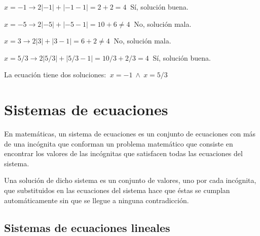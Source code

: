 \begin{miejercicio}
\vspace{2mm} $x=-1 \to 2|-1|+|-1-1|=2+2=4 \ $ Sí, solución buena.

\vspace{2mm} $x=-5 \to 2|-5|+|-5-1|=10+6\neq 4 \ $ No, solución mala.

\vspace{2mm} $x=3\to 2|3|+|3-1|=6+2\neq 4 \ $ No, solución mala.

\vspace{2mm} $x=5/3 \to 2|5/3|+|5/3-1|=10/3+2/3=4\ $ Sí, solución buena.

\vspace{2mm} La ecuación tiene dos soluciones: $\ x=-1 \ \wedge \ x=5/3$


\end{miejercicio}


\vspace{1cm}
\section{Sistemas de ecuaciones}
\vspace{0.5cm}

En matemáticas, un sistema de ecuaciones es un conjunto de ecuaciones con más de una incógnita que conforman un problema matemático que consiste en encontrar los valores de las incógnitas que satisfacen todas las ecuaciones del sistema.

Una solución de dicho sistema es un conjunto de valores, uno por cada incógnita, que substituidos en las ecuaciones del sistema hace que éstas se cumplan automáticamente sin que se llegue a ninguna contradicción. 

\subsection{Sistemas de ecuaciones lineales}

